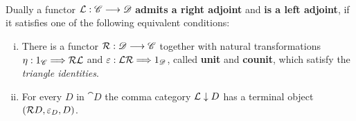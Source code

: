 \begin{definition}
		~\\
		Dually a functor $\mathcal{L}:\mathscr{C} --> \mathscr{D}$ \textbf{admits a right adjoint} and \textbf{is a left adjoint}, if it satisfies one of the following equivalent conditions:
		\begin{enumerate}[(i)]
			\item{
				There is a functor $\mathcal{R}:\mathscr{D} --> \mathscr{C}$ together with natural transformations $\eta: 1_{\mathscr{C}} ==> \mathcal{RL}$ and $\varepsilon: \mathcal{LR} ==> 1_{\mathscr{D}}$, called \textbf{unit} and \textbf{counit}, which satisfy the \textit{triangle identities}.
			}
			\item{
				\begin{minipage}[t]{\linewidth-4cm}
					For every $D$ in $\cat{D}$ the comma category $\mathcal{L} \downarrow D$ has a terminal object $(\mathcal{R}D,\varepsilon_D,D)$.\vspace{.5em}


\end{minipage}}
\end{enumerate}
\end{definition}
